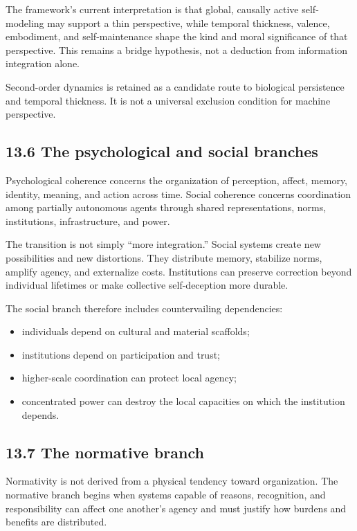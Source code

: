 \documentclass[
  11pt,
]{article}
\providecommand{\tightlist}{%
  \setlength{\itemsep}{0pt}\setlength{\parskip}{0pt}}
\begin{document}
The framework's current interpretation is that global, causally active
self-modeling may support a thin perspective, while temporal thickness,
valence, embodiment, and self-maintenance shape the kind and moral
significance of that perspective. This remains a bridge hypothesis, not
a deduction from information integration alone.

Second-order dynamics is retained as a candidate route to biological
persistence and temporal thickness. It is not a universal exclusion
condition for machine perspective.

\subsection{13.6 The psychological and social
branches}\label{the-psychological-and-social-branches}

Psychological coherence concerns the organization of perception, affect,
memory, identity, meaning, and action across time. Social coherence
concerns coordination among partially autonomous agents through shared
representations, norms, institutions, infrastructure, and power.

The transition is not simply ``more integration.'' Social systems create
new possibilities and new distortions. They distribute memory, stabilize
norms, amplify agency, and externalize costs. Institutions can preserve
correction beyond individual lifetimes or make collective self-deception
more durable.

The social branch therefore includes countervailing dependencies:

\begin{itemize}
\tightlist
\item
  individuals depend on cultural and material scaffolds;
\item
  institutions depend on participation and trust;
\item
  higher-scale coordination can protect local agency;
\item
  concentrated power can destroy the local capacities on which the
  institution depends.
\end{itemize}

\subsection{13.7 The normative branch}\label{the-normative-branch}

Normativity is not derived from a physical tendency toward organization.
The normative branch begins when systems capable of reasons,
recognition, and responsibility can affect one another's agency and must
justify how burdens and benefits are distributed.
\end{document}
